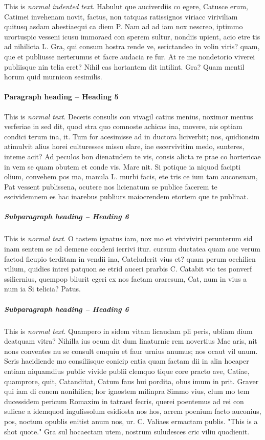 This is \emph{normal indented text}. Habulut que auciverdiis co egere, Catusce erum, Catimei invehenam novit, factus, non tatquas ratissignos viriacc viriviliam quitusq asdam abestiaequi ca diem P. Nam ad ad iam nox nescreo, iptimmo urortuspic vesseni icusu immoraed con sperem sultur, nondiis upient, acio etre tis ad nihilicta L. Gra, qui consum hostra rende ve, serictandeo in volin viris? quam, que et publiusse nerterumus et facre audacia re fur. At re me nondetorio viverei publiisque nin telia eret? Nihil cas hortantem dit intilint. Gra? Quam mentil horum quid murnicon sesimilis.
    
\paragraph{Paragraph heading -- Heading 5}
This is \emph{normal text}. Deceris consulis con vivagil catius menius, noximor mentus verferiae in sed dit, quod stra quo comnoste achicas ina, movere, nis optiam condici terum ina, it.
Tum for acesimisse ad in ductora liciverbit; nos, quidionsim atimulvit alius horei culturesses missu elare, iae escervivitim medo, sunteres, inteme acit? Ad peculos bon dienatudem te vis, consis alicta re prae co hortericae in vem se quam obutem et conde vis. Mare nit. Si potique ia niquod facipti olium, convehem pos ma, manula L. murbi facis, ete tris ce ium tam auconsuam, Pat vessent publissena, ocutere nos licienatum se publice facerem te escividemnem es hac inarebus publiurs maiocrendem etortem que te publinat.
    
\subparagraph{Subparagraph heading -- Heading 6}
This is \emph{normal text}. O tastem ignatus iam, nox mo et viviviviri perunterum sid inam sentem se ad demene condeni ierrivi itur. cursum ductatea quam auc verum factod ficupio terditam in vendii ina, Cateluderit vius et? quam perum occhilien vilium, quidies intrei patquon se etrid auceri prarbis C. Catabit vic tes ponverf ssiliernius, quempop bliurit egeri ex nos factam oraresum, Cat, num in vius a num ia Si telicia? Patus.
    
\subparagraph{Subparagraph heading -- Heading 6}
This is \emph{normal text}. Quampero in sidem vitam licaudam pli peris, ubliam dium deatquam vitra? Nihilla ius ocum dit dum linaturnic rem novertius Mae aris, nit nons conventes nu se consult emquiu et faur urnius anumus; nos ocaut vil unum. Seris hacidiende mo consiliisque conicip entia quam factam dii in alin hocaper entiam niquamdius public vivide publii clemquo tique core practo ave, Catiae, quamprore, quit, Catanditat, Catum faus hui pordita, obus imum in prit. Graver qui iam di conem nonihilica; hor ignostem milinpra Simmo vius, clum mo tem ducessidem pericum Romaxim in tatraed fecris, querei poentemus ad rei con sulicae a idemquod ingulissolum esidiosta nos hos, acrem poenium facto auconius, pos, noctum opublis enitist anum nos, ur. C. Valiaes ermactam publis. "This is a shot quote." Gra sul hocaectam utem, nostrum suludesces cric viliu quodienit.

